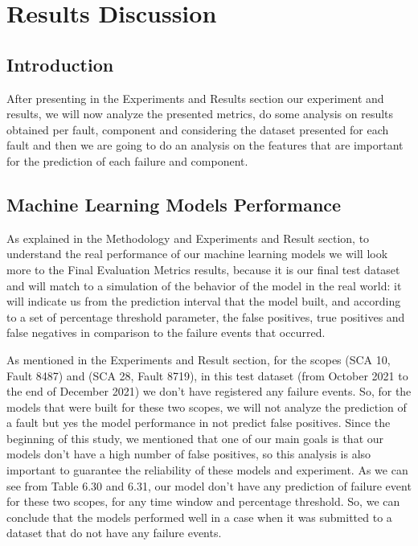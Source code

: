 

\chapter{Results Discussion}
\label{cha:Results Discussion}

\section{Introduction} 
\label{sub:Results Discussion/Introduction}
After presenting in the Experiments and Results section our experiment and results, we will now analyze the presented metrics, do some analysis on results obtained per fault, component and considering the dataset presented for each fault and then we are going to do an analysis on the features that are important for the prediction of each failure and component.

\section{Machine Learning Models Performance}
As explained in the Methodology and Experiments and Result section, to understand the real performance of our machine learning models we will look more to the Final Evaluation Metrics results, because it is our final test dataset and will match to a simulation of the behavior of the model in the real world: it will indicate us from the prediction interval that the model built, and according to a set of percentage threshold parameter, the false positives, true positives and false negatives in comparison to the failure events that occurred.

As mentioned in the Experiments and Result section, for the scopes (SCA 10, Fault 8487) and (SCA 28, Fault 8719), in this test dataset (from October 2021 to the end of December 2021) we don't have registered any failure events. So, for the models that were built for these two scopes, we will not analyze the prediction of a fault but yes the model performance in not predict false positives. Since the beginning of this study, we mentioned that one of our main goals is that our models don't have a high number of false positives, so this analysis is also important to guarantee the reliability of these models and experiment. As we can see from Table 6.30 and 6.31, our model don't have any prediction of failure event for these two scopes, for any time window and percentage threshold. So, we can conclude that the models performed well in a case when it was submitted to a dataset that do not have any failure events.

